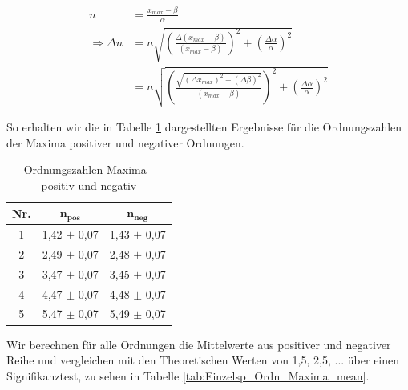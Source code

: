 \documentclass{article}
\begin{document}
\begin{equation}
    \begin{split}
        n &= \frac{x_{max} - \beta}{\alpha} \\
        \Rightarrow \Delta n &= n \sqrt{\left( \frac{\Delta (x_{max} - \beta)}{(x_{max} - \beta)} \right)^2 + \left( \frac{\Delta \alpha}{\alpha} \right)^2} \\
        &=  n \sqrt{\left( \frac{\sqrt{(\Delta x_{max})^2 + (\Delta \beta)^2}}{(x_{max} - \beta)} \right)^2 + \left( \frac{\Delta \alpha}{\alpha} \right)^2}
    \end{split}
\end{equation}

So erhalten wir die in Tabelle \ref{tab:Einzelsp_Ordn_Maxima} dargestellten Ergebnisse für die Ordnungszahlen der Maxima positiver und negativer Ordnungen. 

\phantom{.}

\begin{table}[!h]
    \centering
    \begin{tabular}{ccc}
        \hline
        \textbf{Nr.} & $\bm{n_{pos}}$ & $\bm{n_{neg}}$ \\ \hline
             1 &  1,42 $\pm$ 0,07 &  1,43 $\pm$ 0,07 \\
             2 &  2,49 $\pm$ 0,07 &  2,48 $\pm$ 0,07 \\
             3 &  3,47 $\pm$ 0,07 &  3,45 $\pm$ 0,07 \\
             4 &  4,47 $\pm$ 0,07 &  4,48 $\pm$ 0,07 \\
             5 &  5,47 $\pm$ 0,07 &  5,49 $\pm$ 0,07 \\ \hline
    \end{tabular}%
    \caption{Ordnungszahlen Maxima - positiv und negativ}
    \label{tab:Einzelsp_Ordn_Maxima}
\end{table}

\phantom{.}

Wir berechnen für alle Ordnungen die Mittelwerte aus positiver und negativer Reihe und vergleichen mit den Theoretischen Werten von 1,5, 2,5, ... über einen Signifikanztest, zu sehen in Tabelle \ref{tab:Einzelsp_Ordn_Maxima_mean}.

\phantom{.}
\end{document}
